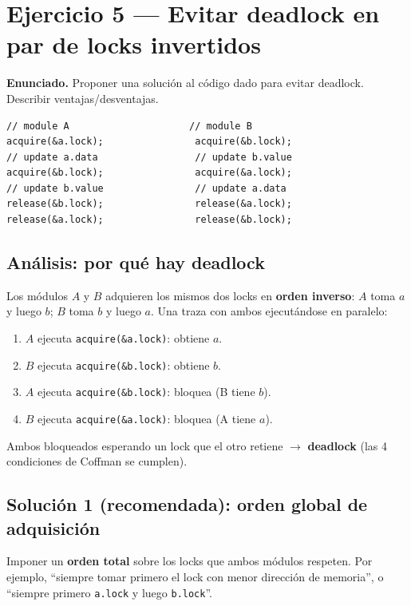 \documentclass[11pt,a4paper]{article}
\begin{document}
\section{Ejercicio 5 --- Evitar deadlock en par de locks invertidos}

\textbf{Enunciado.} Proponer una solución al código dado para evitar
deadlock. Describir ventajas/desventajas.

\begin{lstlisting}[style=cstyle]
// module A                     // module B
acquire(&a.lock);                acquire(&b.lock);
// update a.data                 // update b.value
acquire(&b.lock);                acquire(&a.lock);
// update b.value                // update a.data
release(&b.lock);                release(&a.lock);
release(&a.lock);                release(&b.lock);
\end{lstlisting}

\subsection*{Análisis: por qué hay deadlock}

Los módulos $A$ y $B$ adquieren los mismos dos locks en
\textbf{orden inverso}: $A$ toma $a$ y luego $b$; $B$ toma $b$ y
luego $a$. Una traza con ambos ejecutándose en paralelo:

\begin{enumerate}[leftmargin=*,nosep]
    \item $A$ ejecuta \texttt{acquire(\&a.lock)}: obtiene $a$.
    \item $B$ ejecuta \texttt{acquire(\&b.lock)}: obtiene $b$.
    \item $A$ ejecuta \texttt{acquire(\&b.lock)}: bloquea (B tiene $b$).
    \item $B$ ejecuta \texttt{acquire(\&a.lock)}: bloquea (A tiene $a$).
\end{enumerate}

Ambos bloqueados esperando un lock que el otro retiene $\to$
\textbf{deadlock} (las 4 condiciones de Coffman se cumplen).

\subsection*{Solución 1 (recomendada): orden global de adquisición}

Imponer un \textbf{orden total} sobre los locks que ambos módulos
respeten. Por ejemplo, ``siempre tomar primero el lock con menor
dirección de memoria'', o ``siempre primero \texttt{a.lock} y luego
\texttt{b.lock}''.
\end{document}
